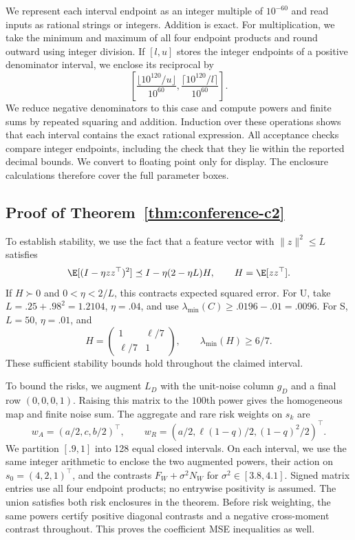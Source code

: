 We represent each interval endpoint as an integer multiple of $10^{-60}$ and
read inputs as rational strings or integers. Addition is exact. For
multiplication, we take the minimum and maximum of all four endpoint products
and round outward using integer division. If $[l,u]$ stores the integer
endpoints of a positive denominator interval, we enclose its reciprocal by
\[
 \left[ \frac{\lfloor10^{120}/u\rfloor}{10^{60}}, \frac{\lceil10^{120}/l\rceil}{10^{60}} \right].
\]
We reduce negative denominators to this case and compute powers and finite sums
by repeated squaring and addition. Induction over these operations shows that
each interval contains the exact rational expression. All acceptance checks
compare integer endpoints, including the check that they lie within the
reported decimal bounds. We convert to floating point only for display. The
enclosure calculations therefore cover the full parameter boxes.

\subsection{Proof of Theorem~\ref{thm:conference-c2}}

To establish stability, we use the fact that a feature vector with
$\|z\|^2 \leq L$ satisfies
\[
 \E[(I-\eta zz^\top)^2] \preceq I - \eta(2 - \eta L)H, \qquad H = \E[zz^\top].
\]
If $H \succ 0$ and $0 < \eta < 2/L$, this contracts expected squared error. For
U, take $L = .25 + .98^2 = 1.2104$, $\eta = .04$, and use
$\lambda_{\min}(C) \geq .0196 - .01 = .0096$. For S, $L = 50$, $\eta = .01$, and
\[
 H = \begin{pmatrix}
      1      & \ell/7 \\
      \ell/7 & 1
     \end{pmatrix},\qquad \lambda_{\min}(H)
   \geq 6/7.
\]
These sufficient stability bounds hold throughout the claimed interval.

To bound the risks, we augment $L_D$ with the unit-noise column $g_D$ and a
final row $(0,0,0,1)$. Raising this matrix to the $100$th power gives the
homogeneous map and finite noise sum. The aggregate and rare risk weights on
$s_k$ are
\[
 w_A = (a/2,c,b/2)^\top,\qquad w_R = (a/2,\ell(1 - q)/2,(1 - q)^2/2)^\top.
\]
We partition $[.9,1]$ into 128 equal closed intervals. On each interval, we use
the same integer arithmetic to enclose the two augmented powers, their action on
$s_0 = (4,2,1)^\top$, and the contrasts $F_W + \sigma^2N_W$ for
$\sigma^2 \in[3.8,4.1]$. Signed matrix entries use all four endpoint products;
no entrywise positivity is assumed. The union satisfies both risk enclosures in
the theorem. Before risk weighting, the same powers certify positive diagonal
contrasts and a negative cross-moment contrast throughout. This proves the
coefficient MSE inequalities as well.

